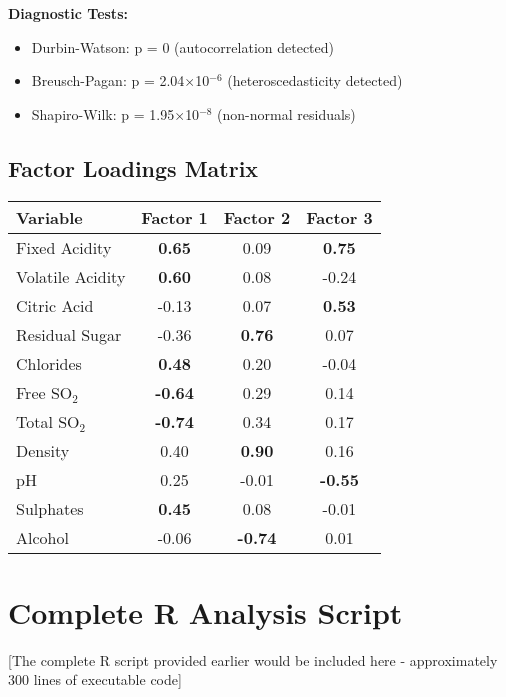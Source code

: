 \textbf{Diagnostic Tests:}
\begin{itemize}
\item Durbin-Watson: p = 0 (autocorrelation detected)
\item Breusch-Pagan: p = 2.04$\times$10$^{-6}$ (heteroscedasticity detected)
\item Shapiro-Wilk: p = 1.95$\times$10$^{-8}$ (non-normal residuals)
\end{itemize}

\section{Factor Loadings Matrix}
\begin{longtable}{|l|c|c|c|}
\hline
\textbf{Variable} & \textbf{Factor 1} & \textbf{Factor 2} & \textbf{Factor 3} \\
\hline
Fixed Acidity & \textbf{0.65} & 0.09 & \textbf{0.75} \\
\hline
Volatile Acidity & \textbf{0.60} & 0.08 & -0.24 \\
\hline
Citric Acid & -0.13 & 0.07 & \textbf{0.53} \\
\hline
Residual Sugar & -0.36 & \textbf{0.76} & 0.07 \\
\hline
Chlorides & \textbf{0.48} & 0.20 & -0.04 \\
\hline
Free SO$_2$ & \textbf{-0.64} & 0.29 & 0.14 \\
\hline
Total SO$_2$ & \textbf{-0.74} & 0.34 & 0.17 \\
\hline
Density & 0.40 & \textbf{0.90} & 0.16 \\
\hline
pH & 0.25 & -0.01 & \textbf{-0.55} \\
\hline
Sulphates & \textbf{0.45} & 0.08 & -0.01 \\
\hline
Alcohol & -0.06 & \textbf{-0.74} & 0.01 \\
\hline
\end{longtable}

\chapter{Complete R Analysis Script}

[The complete R script provided earlier would be included here - approximately 300 lines of executable code]

